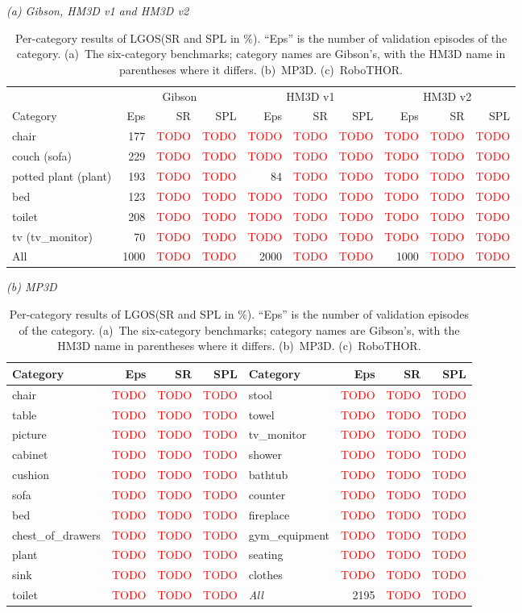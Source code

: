 \documentclass[10pt]{article}
\newcommand{\tbd}{\textcolor{red}{TODO}}
\newcommand{\ours}{LGOS\xspace}
\newcommand{\SR}{\textsc{SR}\xspace}
\newcommand{\SPL}{\textsc{SPL}\xspace}
\begin{document}
\begin{table}[tp]
\centering
\small
\setlength{\tabcolsep}{4pt}
\caption{Per-category results of \ours (\SR and \SPL in \%). ``Eps'' is the number of validation episodes of the category. (a)~The six-category benchmarks; category names are Gibson's, with the HM3D name in parentheses where it differs. (b)~MP3D. (c)~RoboTHOR.}
\label{tab:percategory}
\textit{(a) Gibson, HM3D v1 and HM3D v2}\\[2pt]
\begin{tabular}{l rrr rrr rrr}
\toprule
& \multicolumn{3}{c}{Gibson} & \multicolumn{3}{c}{HM3D v1} & \multicolumn{3}{c}{HM3D v2} \\
\cmidrule(lr){2-4}\cmidrule(lr){5-7}\cmidrule(lr){8-10}
Category & Eps & \SR & \SPL & Eps & \SR & \SPL & Eps & \SR & \SPL \\
\midrule
chair & 177 & \tbd & \tbd & \tbd & \tbd & \tbd & \tbd & \tbd & \tbd \\
couch (sofa) & 229 & \tbd & \tbd & \tbd & \tbd & \tbd & \tbd & \tbd & \tbd \\
potted plant (plant) & 193 & \tbd & \tbd & 84 & \tbd & \tbd & \tbd & \tbd & \tbd \\
bed & 123 & \tbd & \tbd & \tbd & \tbd & \tbd & \tbd & \tbd & \tbd \\
toilet & 208 & \tbd & \tbd & \tbd & \tbd & \tbd & \tbd & \tbd & \tbd \\
tv (tv\_monitor) & 70 & \tbd & \tbd & \tbd & \tbd & \tbd & \tbd & \tbd & \tbd \\
\midrule
All & 1000 & \tbd & \tbd & 2000 & \tbd & \tbd & 1000 & \tbd & \tbd \\
\bottomrule
\end{tabular}

\medskip
\textit{(b) MP3D}\\[2pt]
\begin{tabular}{l rrr l rrr}
\toprule
Category & Eps & \SR & \SPL & Category & Eps & \SR & \SPL \\
\midrule
chair & \tbd & \tbd & \tbd & stool & \tbd & \tbd & \tbd \\
table & \tbd & \tbd & \tbd & towel & \tbd & \tbd & \tbd \\
picture & \tbd & \tbd & \tbd & tv\_monitor & \tbd & \tbd & \tbd \\
cabinet & \tbd & \tbd & \tbd & shower & \tbd & \tbd & \tbd \\
cushion & \tbd & \tbd & \tbd & bathtub & \tbd & \tbd & \tbd \\
sofa & \tbd & \tbd & \tbd & counter & \tbd & \tbd & \tbd \\
bed & \tbd & \tbd & \tbd & fireplace & \tbd & \tbd & \tbd \\
chest\_of\_drawers & \tbd & \tbd & \tbd & gym\_equipment & \tbd & \tbd & \tbd \\
plant & \tbd & \tbd & \tbd & seating & \tbd & \tbd & \tbd \\
sink & \tbd & \tbd & \tbd & clothes & \tbd & \tbd & \tbd \\
toilet & \tbd & \tbd & \tbd & \textit{All} & 2195 & \tbd & \tbd \\
\bottomrule
\end{tabular}


\end{table}
\end{document}
